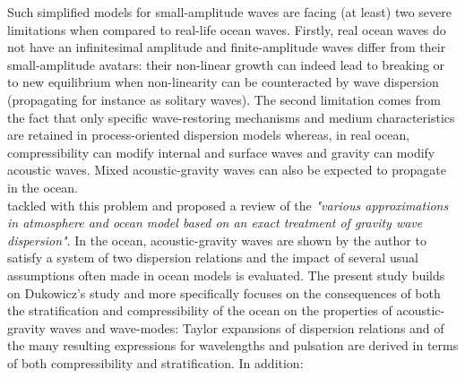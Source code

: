 \documentclass[a4paper,11pt]{article}
\begin{document}
Such simplified models for small-amplitude waves are facing (at least) two severe limitations when compared to real-life ocean waves. Firstly, real ocean waves do not have an infinitesimal amplitude and finite-amplitude waves differ from their small-amplitude avatars: their non-linear growth can indeed lead to breaking or to new equilibrium when non-linearity can be counteracted by wave dispersion (propagating for instance as solitary waves). The second limitation comes from the fact that only specific wave-restoring mechanisms and medium characteristics are retained in process-oriented dispersion models whereas, in real ocean, compressibility can modify internal and surface waves and gravity can modify acoustic waves. Mixed acoustic-gravity waves can also be expected to propagate in the ocean.\\
\cite{dukowicz_2013} tackled with this problem and proposed a review of the \textit{"various approximations in atmosphere and ocean model based on an exact treatment of gravity wave dispersion"}. In the ocean, acoustic-gravity waves are shown by the author to satisfy a system of two dispersion relations and the impact of several usual assumptions often made in ocean models is evaluated. The present study builds on Dukowicz's study and more specifically focuses on the consequences of both the stratification and compressibility of the ocean on the properties of acoustic-gravity waves and wave-modes: Taylor expansions of dispersion relations and of the many resulting expressions for wavelengths and pulsation are derived in terms of both compressibility and stratification. In addition:
\end{document}
